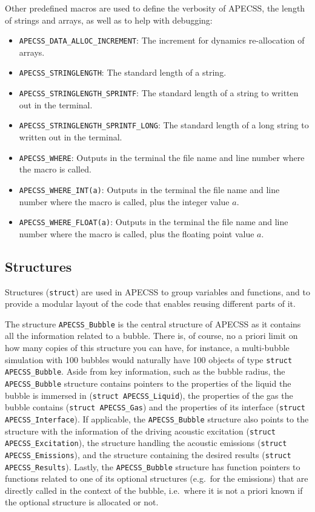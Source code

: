 Other predefined macros are used to define the verbosity of APECSS, the length of strings and arrays, as well as to help with debugging:\vspace{-1em}
\begin{itemize}[noitemsep]
  \item {\tt APECSS\_DATA\_ALLOC\_INCREMENT}: The increment for dynamics re-allocation of arrays.
  \item {\tt APECSS\_STRINGLENGTH}: The standard length of a string.
  \item {\tt APECSS\_STRINGLENGTH\_SPRINTF}: The standard length of a string to written out in the terminal.
  \item {\tt APECSS\_STRINGLENGTH\_SPRINTF\_LONG}: The standard length of a long string to written out in the terminal.
  \item {\tt APECSS\_WHERE}: Outputs in the terminal the file name and line number where the macro is called.
  \item {\tt APECSS\_WHERE\_INT(a)}: Outputs in the terminal the file name and line number where the macro is called, plus the integer value $a$.
  \item {\tt APECSS\_WHERE\_FLOAT(a)}: Outputs in the terminal the file name and line number where the macro is called, plus the floating point value $a$.
\end{itemize}


\subsection{Structures}

Structures ({\tt struct}) are used in APECSS to group variables and functions, and to provide a modular layout of the code that enables reusing different parts of it.

The structure {\tt APECSS\_Bubble} is the central structure of APECSS as it contains all the information related to a bubble. There is, of course, no a priori limit on how many copies of this structure you can have, for instance, a multi-bubble simulation with 100 bubbles would naturally have 100 objects of type {\tt struct APECSS\_Bubble}. Aside from key information, such as the bubble radius, the {\tt APECSS\_Bubble} structure contains pointers to the properties of the liquid the bubble is immersed in ({\tt struct APECSS\_Liquid}), the properties of the gas the bubble contains ({\tt struct APECSS\_Gas}) and the properties of its interface ({\tt struct APECSS\_Interface}). If applicable, the {\tt APECSS\_Bubble} structure also points to the structure with the information of the driving acoustic excitation ({\tt struct APECSS\_Excitation}), the structure handling the acoustic emissions ({\tt struct APECSS\_Emissions}), and the structure containing the desired results ({\tt struct APECSS\_Results}). Lastly, the {\tt APECSS\_Bubble} structure has function pointers to functions related to one of its optional structures (e.g.~for the emissions) that are directly called in the context of the bubble, i.e.~where it is not a priori known if the optional structure is allocated or not.

